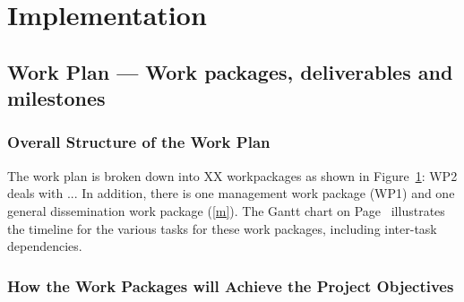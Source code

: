 \documentclass[a4paper,11pt]{article}
\begin{document}
\clearpage




\section{Implementation}

\subsection{Work Plan --- Work packages, deliverables and milestones}
\label{sect:workplan}


\subsubsection*{Overall Structure of the Work Plan}

The work plan is broken down into XX workpackages as shown
in Figure~\ref{}: WP2 deals with  ...
In addition, there is one management work package (WP1) and one
general dissemination work package (\ref{m}). The Gantt chart on
Page~\pageref{fig:gantt} illustrates the timeline for the
various tasks for these work packages, including inter-task
dependencies.

\subsubsection*{How the Work Packages will Achieve the Project Objectives}
\label{sssec:how_the_work_packages_will_achieve}
\end{document}
